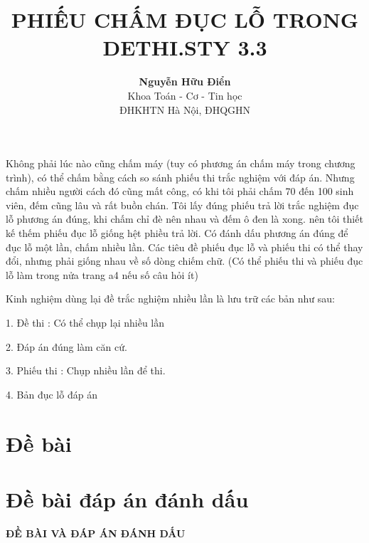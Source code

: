 \documentclass[11pt]{article}
\begin{document}
\title{\bf PHIẾU CHẤM ĐỤC LỖ TRONG DETHI.STY 3.3} %
\author{{\bf Nguyễn Hữu Điển}\\
Khoa Toán - Cơ - Tin học\\
ĐHKHTN Hà Nội, ĐHQGHN
} %
\date{} %

\maketitle
\vspace*{1cm}

\tableofcontents
% 
\vspace*{1cm}
Không phải lúc nào cũng chấm máy (tuy có phương án chấm máy trong chương trình), có thể chấm bằng cách so sánh phiếu thi trắc nghiệm với đáp án. Nhưng chấm nhiều người cách đó cũng mất công, có khi tôi phải chấm 70 đến 100 sinh viên, đếm cũng lâu và rất buồn chán. Tôi lấy đúng phiếu trả lời trắc nghiệm đục lỗ phương án đúng, khi chấm chỉ đè nên nhau và đếm ô đen là xong. nên tôi thiết kế thếm phiếu đục lỗ giống hệt phiều trả lời. Có đánh dấu phương án đúng để đục lỗ một lần, chấm nhiều lần. Các tiêu đề phiếu đục lỗ và phiếu thi có thể thay đổi, nhưng phải giống nhau về số dòng chiếm chữ. (Có thể phiếu thi và phiếu đục lỗ làm trong nửa trang a4 nếu số câu hỏi ít)

Kinh nghiệm dùng lại đề trắc nghiệm nhiều lần là lưu trữ các bản như sau:

1. Đề thi : Có thể chụp lại nhiều lần

2. Đáp án đúng làm căn cứ.

3. Phiếu thi : Chụp nhiều lần để thi.

4. Bản đục lỗ đáp án 
 \setlength{\shortitemwidth}{\textwidth/4-3.5em}
\newpage
\section{Đề bài}

\indebai

\lamtieude

\begin{enumerate}[]
\foreachproblem[bttracnghiem]{\item\causo\thisproblem}
\end{enumerate}
\newpage
\section{Đề bài đáp án đánh dấu}
\indebaidapan
\lamtieude
\begin{center}
{\bf ĐỀ BÀI VÀ ĐÁP ÁN ĐÁNH DẤU}
\end{center}
\begin{enumerate}[]
\foreachproblem[bttracnghiem]{\item\causo\thisproblem}
\end{enumerate}
\newpage
\end{document}
